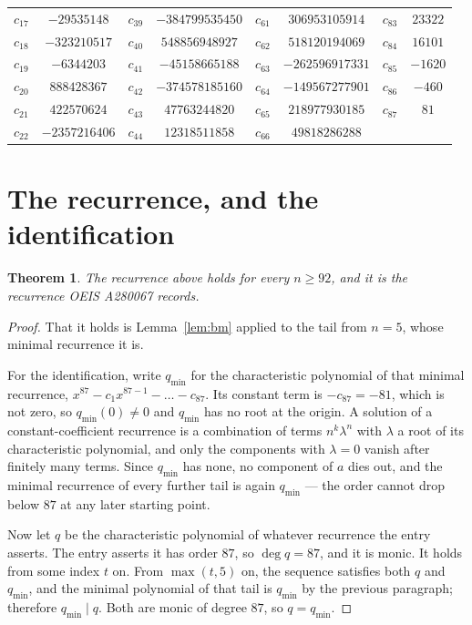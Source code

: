 \documentclass[11pt,a4paper]{article}
\theoremstyle{plain}
\newtheorem{theorem}{Theorem}
\theoremstyle{definition}
\begin{document}
\begin{center}
\begin{tabular}{cccccccc}
$c_{17}$ & $-29535148$ & $c_{39}$ & $-384799535450$ & $c_{61}$ & $306953105914$ & $c_{83}$ & $23322$ \\
$c_{18}$ & $-323210517$ & $c_{40}$ & $548856948927$ & $c_{62}$ & $518120194069$ & $c_{84}$ & $16101$ \\
$c_{19}$ & $-6344203$ & $c_{41}$ & $-45158665188$ & $c_{63}$ & $-262596917331$ & $c_{85}$ & $-1620$ \\
$c_{20}$ & $888428367$ & $c_{42}$ & $-374578185160$ & $c_{64}$ & $-149567277901$ & $c_{86}$ & $-460$ \\
$c_{21}$ & $422570624$ & $c_{43}$ & $47763244820$ & $c_{65}$ & $218977930185$ & $c_{87}$ & $81$ \\
$c_{22}$ & $-2357216406$ & $c_{44}$ & $12318511858$ & $c_{66}$ & $49818286288$ &  &  \\
\end{tabular}
\end{center}

\section{The recurrence, and the identification}

\begin{theorem}
The recurrence above holds for every $n\ge92$, and it is the recurrence OEIS A280067 records.
\end{theorem}

\begin{proof}
That it holds is Lemma~\ref{lem:bm} applied to the tail from $n=5$, whose minimal
recurrence it is.

For the identification, write $q_{\min}$ for the characteristic polynomial of that minimal
recurrence, $x^{87}-c_1x^{87-1}-\dots-c_{87}$. Its constant term is
$-c_{87}=-81$, which is not zero, so $q_{\min}(0)\neq0$ and $q_{\min}$ has no
root at the origin. A solution of a constant-coefficient recurrence is a combination of terms
$n^{k}\lambda^{n}$ with $\lambda$ a root of its characteristic polynomial, and only the
components with $\lambda=0$ vanish after finitely many terms. Since $q_{\min}$ has none, no
component of $a$ dies out, and the minimal recurrence of every further tail is again
$q_{\min}$ --- the order cannot drop below $87$ at any later starting point.

Now let $q$ be the characteristic polynomial of whatever recurrence the entry asserts. The
entry asserts it has order $87$, so $\deg q=87$, and it is monic. It holds from some
index $t$ on. From $\max(t,5)$ on, the sequence satisfies both $q$ and $q_{\min}$, and
the minimal polynomial of that tail is $q_{\min}$ by the previous paragraph; therefore
$q_{\min}\mid q$. Both are monic of degree $87$, so $q=q_{\min}$.
\end{proof}
\end{document}
